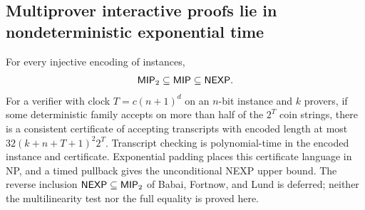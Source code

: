 \begin{result}
\subsection{Multiprover interactive proofs lie in nondeterministic exponential time}
For every injective encoding of instances,
\[
\mathsf{MIP}_2\subseteq\mathsf{MIP}\subseteq\mathsf{NEXP}.
\]
For a verifier with clock $T=c(n+1)^d$ on an $n$-bit instance and $k$ provers, if some deterministic
family accepts on more than half of the $2^T$ coin strings, there is a consistent certificate of
accepting transcripts with encoded length at most $32(k+n+T+1)^2 2^T$. Transcript checking is
polynomial-time in the encoded instance and certificate. Exponential padding places this
certificate language in NP, and a timed pullback gives the unconditional NEXP upper bound.
The reverse inclusion $\mathsf{NEXP}\subseteq\mathsf{MIP}_2$ of Babai, Fortnow, and Lund is deferred;
neither the multilinearity test nor the full equality is proved here.
\citep{BabaiFortnowLund1991}\citep[Section 8.5]{AroraBarak09}
\end{result}

